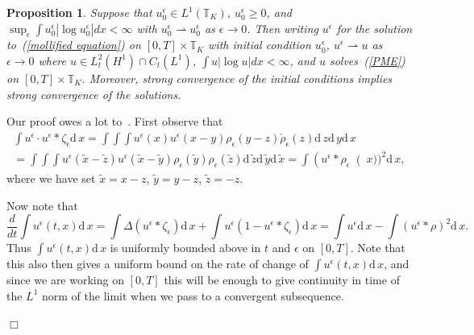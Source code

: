 \documentclass[12pt]{article}
\newenvironment {proof}{{\noindent\bf Proof }}{\hfill $\Box$ \medskip}
\newtheorem{proposition}[theorem]{Proposition}
\def \tilde{\widetilde}
\newcommand{\IT}{\mathbb T}
\newcommand{\dif}{\mathrm{d}\,}
\begin{document}
\begin{proposition}
Suppose that $u_0^\epsilon\in L^1(\IT_K)$, $u_0^\epsilon\geq 0$, and
$\sup_\epsilon\int u_0^\epsilon|\log u_0^\epsilon|dx<\infty$ with
$u_0^\epsilon\rightharpoonup u_0^\epsilon$ as $\epsilon\to 0$. Then
writing $u^\epsilon$ for the solution to~(\ref{mollified equation})
on $[0,T]\times \IT_K$ with
initial condition $u_0^\epsilon$,
$u^\epsilon\rightharpoonup u$ as $\epsilon\to 0$ where
$u\in L_t^2(H^1)\cap C_t(L^1)$, $\int u|\log u| dx<\infty$, and
$u$ solves~(\ref{PME}) on $[0,T]\times \IT_K$. Moreover, strong convergence
of the initial conditions implies strong convergence of the solutions.
\end{proposition}
\begin{proof}

Our proof owes a lot to~\cite{lions/mas-gallic:2001}.
First observe that
\begin{multline*}
\int u^\epsilon\cdot u^\epsilon*\zeta_\epsilon\dif x
= \int\int\int u^\epsilon(x)u^\epsilon(x-y)\rho_\epsilon(y-z)
\check{\rho}_\epsilon(z)\dif z\dif y\dif x
\\
=
\int\int\int u^\epsilon(\tilde{x}-\tilde{z})
u^\epsilon(\tilde{x}-\tilde{y})
\rho_\epsilon(\tilde{y})
\rho_\epsilon(\tilde{z})\dif \tilde{z}\dif \tilde{y}\dif \tilde{x}
=\int\left(u^\epsilon*\rho_\epsilon\right(x))^2\dif x,
\end{multline*}
where we have set $\tilde{x}=x-z$, $\tilde{y}=y-z$, $\tilde{z}=-z$.

Now note that
$$\frac{d}{dt}\int u^\epsilon (t,x) \dif x=\int \Delta (u^\epsilon*\zeta_\epsilon)\dif x
+\int u^\epsilon(1-u^\epsilon*\zeta_\epsilon)\dif x= \int u^\epsilon \dif x
-\int (u^\epsilon*\rho)^2 \dif x.$$
Thus $\int u^\epsilon(t,x)\dif x$ is uniformly bounded above in $t$
and $\epsilon$ on $[0,T]$. Note that this also then gives a uniform
bound on the rate of change of $\int u^\epsilon (t,x) \dif x$, and since
we are working on $[0,T]$ this will be enough to give continuity in time of the
$L^1$ norm of the limit
when we pass to a convergent subsequence.


\end{proof}
\end{document}
